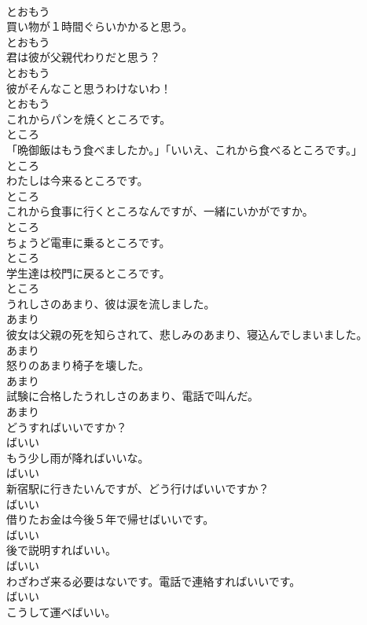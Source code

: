 \documentclass[8pt]{extreport}
\begin{document}
\begin{CJK}{UTF8}{min}
\\	とおもう
\\	買い物が１時間ぐらいかかると思う。	
\\	とおもう
\\	君は彼が父親代わりだと思う？	
\\	とおもう
\\	彼がそんなこと思うわけないわ！	
\\	とおもう
\\	これからパンを焼くところです。	
\\	ところ
\\	「晩御飯はもう食べましたか。」「いいえ、これから食べるところです。」	
\\	ところ
\\	わたしは今来るところです。	
\\	ところ
\\	これから食事に行くところなんですが、一緒にいかがですか。	
\\	ところ
\\	ちょうど電車に乗るところです。	
\\	ところ
\\	学生達は校門に戻るところです。	
\\	ところ
\\	うれしさのあまり、彼は涙を流しました。	
\\	あまり
\\	彼女は父親の死を知らされて、悲しみのあまり、寝込んでしまいました。	
\\	あまり
\\	怒りのあまり椅子を壊した。	
\\	あまり
\\	試験に合格したうれしさのあまり、電話で叫んだ。	
\\	あまり
\\	どうすればいいですか？	
\\	ばいい
\\	もう少し雨が降ればいいな。	
\\	ばいい
\\	新宿駅に行きたいんですが、どう行けばいいですか？	
\\	ばいい
\\	借りたお金は今後５年で帰せばいいです。	
\\	ばいい
\\	後で説明すればいい。	
\\	ばいい
\\	わざわざ来る必要はないです。電話で連絡すればいいです。	
\\	ばいい
\\	こうして運べばいい。	

\end{CJK}
\end{document}
